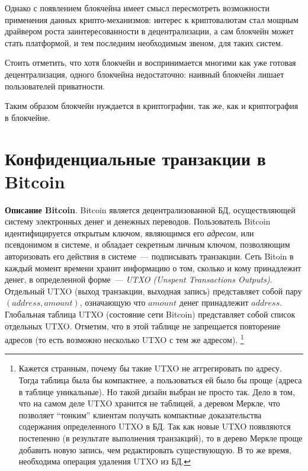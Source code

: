 \documentclass{article}
\begin{document}
 Однако с появлением блокчейна имеет смысл пересмотреть
 возможности применения данных крипто-механизмов:
 интерес к криптовалютам стал мощным драйвером роста заинтересованности в децентрализации,
  а сам блокчейн может стать платформой,
  и тем последним необходимым звеном,  для таких систем.

  Стоить отметить, что хотя блокчейн и воспринимается многими как уже готовая децентрализация,
   одного блокчейна недостаточно: наивный блокчейн лишает пользователей приватности.

Таким образом блокчейн нуждается в криптографии, так же, как и криптография в блокчейне.

\section{Конфиденциальные транзакции в Bitcoin}

{\bf Описание Bitcoin}.
Bitcoin является децентрализованной БД, осуществляющей систему электронных денег и денежных переводов.
Пользователь Bitcoin идентифицируется открытым ключом, являющимся его \textit{адресом}, или псевдонимом в системе,
и обладает секретным личным ключом, позволяющим авторизовать его действия в системе~--- подписывать транзакции.
Сеть Bitoin в каждый момент времени хранит информацию о том, сколько и кому принадлежит денег,
в определенной форме~--- \textit{UTXO (Unspent Transactions Outputs)}.
Отдельный UTXO (выход транзакции, выходная запись) представляет собой пару $(address, amount)$,
означающую что $amount$ денег принадлежит $address$.
Глобальная таблица UTXO (состояние сети Bitcoin) представляет собой список отдельных UTXO.
Отметим, что в этой таблице не запрещается повторение адресов (то есть возможно несколько UTXO с тем же адресом).
\footnote{Кажется странным, почему бы такие UTXO не аггрегировать по адресу.
Тогда таблица была бы компактнее,
а пользоваться ей было бы проще (адреса в таблице уникальные). Но такой дизайн выбран не просто так.
Дело в том, что на самом деле UTXO хранится не таблицей, а деревом Меркле,
что позволяет ``тонким'' клиентам
получать компактные доказательства содержания определенного UTXO в БД.
Так как новые UTXO появляются постепенно (в результате выполнения транзакций),
то в дерево Меркле проще добавить новую запись, чем редактировать существующую.
В то же время, необходима операция удаления UTXO из БД.}
\end{document}
